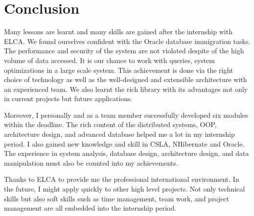 \chapter{Conclusion}
Many lessons are learnt and many skills are gained after the internship with ELCA. We found ourselves confident with the Oracle database immigration tasks. The performance and security of the system are not violated despite of the high volume of data accessed. It is our chance to work with queries, system optimizations in a large scale system. This achievement is done via the right choice of technology as well as the well-designed and extensible architecture with an experienced team. We also learnt the rich library with its advantages not only in current projects but future applications. 
\par
Moreover, I personally and as a team member successfully developed six modules within the deadline.  The rich content of the distributed systems, OOP, architecture design, and advanced database helped me a lot in my internship period.  I also gained new knowledge and skill in CSLA, NHibernate and Oracle. The experience in system analysis, database design, architecture design, and data manipulation must also be counted into my achievements. 
\par
Thanks to ELCA to provide me the professional international environment. In the future, I might apply quickly to other high level projects. Not only technical skills but also soft skills such as time management, team work, and project management are all embedded into the internship period. 
%



